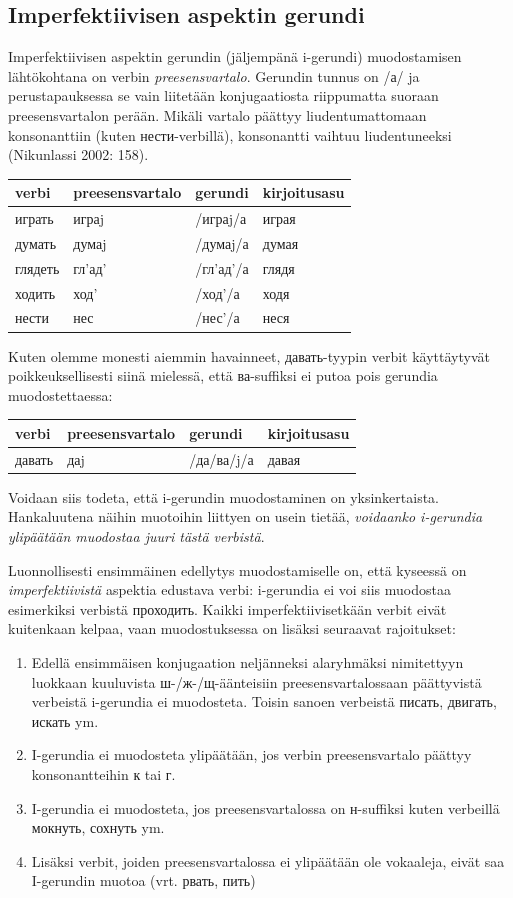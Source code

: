 \documentclass[]{scrreprt}
\providecommand{\tightlist}{%
  \setlength{\itemsep}{0pt}\setlength{\parskip}{0pt}}
\begin{document}
\subsection{Imperfektiivisen aspektin
gerundi}\label{imperfektiivisen-aspektin-gerundi}

Imperfektiivisen aspektin gerundin (jäljempänä i-gerundi) muodostamisen
lähtökohtana on verbin \emph{preesensvartalo}. Gerundin tunnus on /а/ ja
perustapauksessa se vain liitetään konjugaatiosta riippumatta suoraan
preesensvartalon perään. Mikäli vartalo päättyy liudentumattomaan
konsonanttiin (kuten нести-verbillä), konsonantti vaihtuu liudentuneeksi
(Nikunlassi 2002: 158).

\begin{longtable}[c]{@{}llll@{}}
\toprule
verbi & preesensvartalo & gerundi & kirjoitusasu\tabularnewline
\midrule
\endhead
играть & играj & /играj/а & играя\tabularnewline
думать & думаj & /думаj/а & думая\tabularnewline
глядеть & гл'ад' & /гл'ад'/а & глядя\tabularnewline
ходить & ход' & /ход'/а & ходя\tabularnewline
нести & нес & /нес'/а & неся\tabularnewline
\bottomrule
\end{longtable}

Kuten olemme monesti aiemmin havainneet, давать-tyypin verbit
käyttäytyvät poikkeuksellisesti siinä mielessä, että ва-suffiksi ei
putoa pois gerundia muodostettaessa:

\begin{longtable}[c]{@{}llll@{}}
\toprule
verbi & preesensvartalo & gerundi & kirjoitusasu\tabularnewline
\midrule
\endhead
давать & даj & /да/ва/j/а & давая\tabularnewline
\bottomrule
\end{longtable}

Voidaan siis todeta, että i-gerundin muodostaminen on yksinkertaista.
Hankaluutena näihin muotoihin liittyen on usein tietää, \emph{voidaanko
i-gerundia ylipäätään muodostaa juuri tästä verbistä}.

Luonnollisesti ensimmäinen edellytys muodostamiselle on, että kyseessä
on \emph{imperfektiivistä} aspektia edustava verbi: i-gerundia ei voi
siis muodostaa esimerkiksi verbistä проходить. Kaikki
imperfektiivisetkään verbit eivät kuitenkaan kelpaa, vaan muodostuksessa
on lisäksi seuraavat rajoitukset:

\begin{enumerate}
\def\labelenumi{\arabic{enumi}.}
\tightlist
\item
  Edellä ensimmäisen konjugaation neljänneksi alaryhmäksi nimitettyyn
  luokkaan kuuluvista ш-/ж-/щ-äänteisiin preesensvartalossaan
  päättyvistä verbeistä i-gerundia ei muodosteta. Toisin sanoen
  verbeistä писать, двигать, искать ym.
\item
  I-gerundia ei muodosteta ylipäätään, jos verbin preesensvartalo
  päättyy konsonantteihin к tai г.
\item
  I-gerundia ei muodosteta, jos preesensvartalossa on н-suffiksi kuten
  verbeillä мокнуть, сохнуть ym.
\item
  Lisäksi verbit, joiden preesensvartalossa ei ylipäätään ole vokaaleja,
  eivät saa I-gerundin muotoa (vrt. рвать, пить)
\end{enumerate}
\end{document}
